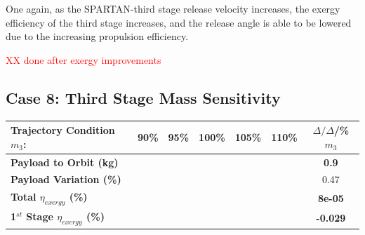 One again, as the SPARTAN-third stage release velocity increases, the exergy efficiency of the third stage increases, and the release angle is able to be lowered due to the increasing propulsion efficiency. 

\textcolor{red}{XX done after exergy improvements}

\subsection{Case 8: Third Stage Mass Sensitivity}\label{sec:m3noReturn}

\begin{table}[ht]
	\centering
	
	\begin{tabular}{l c c c c c c} 
		\hline \textbf{Trajectory Condition}   \qquad  $m_{3}$:
		&90\%
		&95\%
		&100\%
		&105\%
		&110\%
		& $\Delta/\Delta$/\%$m_{3}$
		\\
		\hline \textbf{Payload to Orbit (kg)}
		& \textbf{\PayloadToOrbitmThreeNinetyNoReturn}
		& \textbf{\PayloadToOrbitmThreeNinetyFiveNoReturn}
		& \textbf{\PayloadToOrbitmThreeStandardNoReturn}
		& \textbf{\PayloadToOrbitmThreeOneHundredFiveNoReturn}
		& \textbf{\PayloadToOrbitmThreeOneHundredTenNoReturn}
		&\textbf{0.9}
		\\
		\textbf{Payload Variation (\%)}
		& \PayloadVarmThreeNinetyNoReturn
		& \PayloadVarmThreeNinetyFiveNoReturn
		& \PayloadVarmThreeStandardNoReturn
		& \PayloadVarmThreeOneHundredFiveNoReturn
		& \PayloadVarmThreeOneHundredTenNoReturn
		&0.47
		\\
		\textbf{Total $\eta_{exergy}$ (\%)}
		& \textbf{\totalExergyEffmThreeNinetyNoReturn}
		& \textbf{\totalExergyEffmThreeNinetyFiveNoReturn}
		& \textbf{\totalExergyEffmThreeStandardNoReturn}
		& \textbf{\totalExergyEffmThreeOneHundredFiveNoReturn}
		& \textbf{\totalExergyEffmThreeOneHundredTenNoReturn}
		& \textbf{8e-05}
		\\
		\hline 
		\textbf{1$^{st}$ Stage $\eta_{exergy}$ (\%)}
		& \textbf{\firstExergyEffmThreeNinetyNoReturn}
		& \textbf{\firstExergyEffmThreeNinetyFiveNoReturn}
		& \textbf{\firstExergyEffmThreeStandardNoReturn}
		& \textbf{\firstExergyEffmThreeOneHundredFiveNoReturn}
		& \textbf{\firstExergyEffmThreeOneHundredTenNoReturn}
		& \textbf{-0.029}
		\\
	

\end{tabular}
\end{table}

